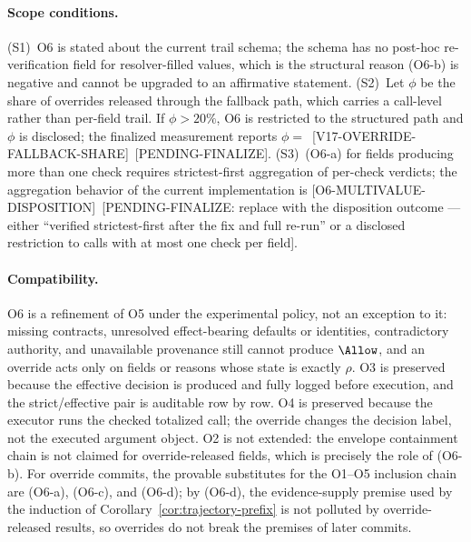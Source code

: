 \paragraph{Scope conditions.}
(S1)~O6 is stated about the current trail schema; the schema has no
post-hoc re-verification field for resolver-filled values, which is the
structural reason (O6-b) is negative and cannot be upgraded to an
affirmative statement.
(S2)~Let $\phi$ be the share of overrides released through the fallback
path, which carries a call-level rather than per-field trail. If
$\phi>20\%$, O6 is restricted to the structured path and $\phi$ is disclosed;
the finalized measurement reports
$\phi=$~[V17-OVERRIDE-FALLBACK-SHARE]~[PENDING-FINALIZE].
(S3)~(O6-a) for fields producing more than one check requires strictest-first
aggregation of per-check verdicts; the aggregation behavior of the current
implementation is [O6-MULTIVALUE-DISPOSITION]~[PENDING-FINALIZE: replace with
the disposition outcome --- either ``verified strictest-first after the fix
and full re-run'' or a disclosed restriction to calls with at most one check
per field].

\paragraph{Compatibility.}
O6 is a refinement of O5 under the experimental policy, not an exception to
it: missing contracts, unresolved effect-bearing defaults or identities,
contradictory authority, and unavailable provenance still cannot produce
$\Allow$, and an override acts only on fields or reasons whose state is
exactly $\rho$. O3 is preserved because the effective decision is produced
and fully logged before execution, and the strict/effective pair is auditable
row by row. O4 is preserved because the executor runs the checked totalized
call; the override changes the decision label, not the executed argument
object. O2 is not extended: the envelope containment chain is not claimed for
override-released fields, which is precisely the role of (O6-b). For
override commits, the provable substitutes for the O1--O5 inclusion chain are
(O6-a), (O6-c), and (O6-d); by (O6-d), the evidence-supply premise used by
the induction of Corollary~\ref{cor:trajectory-prefix} is not polluted by
override-released results, so overrides do not break the premises of later
commits.


